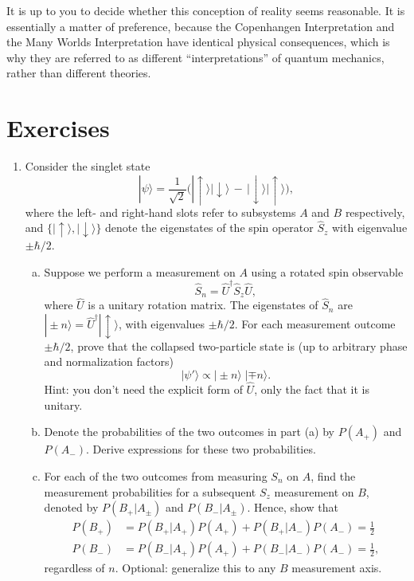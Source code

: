 \documentclass[pra,12pt]{revtex4-2}
\begin{document}
It is up to you to decide whether this conception of reality seems
reasonable.  It is essentially a matter of preference, because the
Copenhangen Interpretation and the Many Worlds Interpretation have
identical physical consequences, which is why they are referred to as
different ``interpretations'' of quantum mechanics, rather than
different theories.


\section*{Exercises}

\begin{enumerate}

\item \label{ex:singletproperties}
Consider the singlet state
\begin{equation}
  |\psi\rangle = \frac{1}{\sqrt{2}} \Big(|\!\uparrow\rangle|\!\downarrow\rangle \,-\, |\!\downarrow\rangle|\!\uparrow\rangle\Big),
\end{equation}
where the left- and right-hand slots refer to subsystems $A$ and $B$
respectively, and $\{|\!\uparrow\rangle, |\!\downarrow\rangle\}$
denote the eigenstates of the spin operator $\hat{S}_z$ with
eigenvalue $\pm\hbar/2$.
\begin{enumerate}[(a)]
\item Suppose we perform a measurement on $A$ using a rotated spin
  observable
\begin{equation}
  \hat{S}_n = \hat{U}^\dagger \hat{S}_z \hat{U},
\end{equation}
where $\hat{U}$ is a unitary rotation matrix.  The eigenstates of
$\hat{S}_n$ are $|\!\pm n\rangle = \hat{U}^\dagger |\!\updownarrow\rangle$, with
eigenvalues $\pm \hbar/2$.  For each measurement outcome $\pm\hbar/2$,
prove that the collapsed two-particle state is (up to arbitrary phase
and normalization factors)
\begin{equation}
  |\psi'\rangle \propto |\pm \!n \rangle\; |\mp\! n\rangle.
\end{equation}
Hint: you don't need the explicit form of $\hat{U}$, only the fact
that it is unitary.

\item Denote the probabilities of the two outcomes in part (a) by
  $P(A_+)$ and $P(A_-)$.  Derive expressions for these two
  probabilities.

\item For each of the two outcomes from measuring $S_n$ on $A$, find
  the measurement probabilities for a subsequent $S_z$ measurement on
  $B$, denoted by $P(B_+|A_\pm)$ and $P(B_-|A_\pm)$.  Hence, show that
  \begin{align}
    P(B_+) &= P(B_+|A_+) P(A_+) + P(B_+|A_-) P(A_-) = \frac{1}{2}\\
    P(B_-) &= P(B_-|A_+) P(A_+) + P(B_-|A_-) P(A_-) = \frac{1}{2},
  \end{align}
  regardless of $n$.  Optional: generalize this to any $B$ measurement
  axis.


\end{enumerate}
\end{enumerate}
\end{document}
